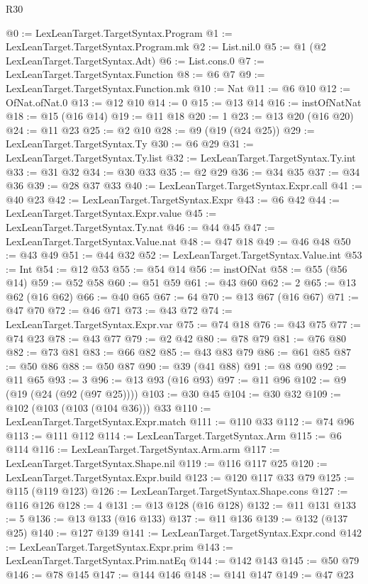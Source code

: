 \begin{lexlean}{R30}
\begin{coremodule}
@0 := LexLeanTarget.TargetSyntax.Program
@1 := LexLeanTarget.TargetSyntax.Program.mk
@2 := List.nil.{0}
@5 := @1 (@2 LexLeanTarget.TargetSyntax.Adt)
@6 := List.cons.{0}
@7 := LexLeanTarget.TargetSyntax.Function
@8 := @6 @7
@9 := LexLeanTarget.TargetSyntax.Function.mk
@10 := Nat
@11 := @6 @10
@12 := OfNat.ofNat.{0}
@13 := @12 @10
@14 := 0
@15 := @13 @14
@16 := instOfNatNat
@18 := @15 (@16 @14)
@19 := @11 @18
@20 := 1
@23 := @13 @20 (@16 @20)
@24 := @11 @23
@25 := @2 @10
@28 := @9 (@19 (@24 @25))
@29 := LexLeanTarget.TargetSyntax.Ty
@30 := @6 @29
@31 := LexLeanTarget.TargetSyntax.Ty.list
@32 := LexLeanTarget.TargetSyntax.Ty.int
@33 := @31 @32
@34 := @30 @33
@35 := @2 @29
@36 := @34 @35
@37 := @34 @36
@39 := @28 @37 @33
@40 := LexLeanTarget.TargetSyntax.Expr.call
@41 := @40 @23
@42 := LexLeanTarget.TargetSyntax.Expr
@43 := @6 @42
@44 := LexLeanTarget.TargetSyntax.Expr.value
@45 := LexLeanTarget.TargetSyntax.Ty.nat
@46 := @44 @45
@47 := LexLeanTarget.TargetSyntax.Value.nat
@48 := @47 @18
@49 := @46 @48
@50 := @43 @49
@51 := @44 @32
@52 := LexLeanTarget.TargetSyntax.Value.int
@53 := Int
@54 := @12 @53
@55 := @54 @14
@56 := instOfNat
@58 := @55 (@56 @14)
@59 := @52 @58
@60 := @51 @59
@61 := @43 @60
@62 := 2
@65 := @13 @62 (@16 @62)
@66 := @40 @65
@67 := 64
@70 := @13 @67 (@16 @67)
@71 := @47 @70
@72 := @46 @71
@73 := @43 @72
@74 := LexLeanTarget.TargetSyntax.Expr.var
@75 := @74 @18
@76 := @43 @75
@77 := @74 @23
@78 := @43 @77
@79 := @2 @42
@80 := @78 @79
@81 := @76 @80
@82 := @73 @81
@83 := @66 @82
@85 := @43 @83 @79
@86 := @61 @85
@87 := @50 @86
@88 := @50 @87
@90 := @39 (@41 @88)
@91 := @8 @90
@92 := @11 @65
@93 := 3
@96 := @13 @93 (@16 @93)
@97 := @11 @96
@102 := @9 (@19 (@24 (@92 (@97 @25))))
@103 := @30 @45
@104 := @30 @32
@109 := @102 (@103 (@103 (@104 @36))) @33
@110 := LexLeanTarget.TargetSyntax.Expr.match
@111 := @110 @33
@112 := @74 @96
@113 := @111 @112
@114 := LexLeanTarget.TargetSyntax.Arm
@115 := @6 @114
@116 := LexLeanTarget.TargetSyntax.Arm.arm
@117 := LexLeanTarget.TargetSyntax.Shape.nil
@119 := @116 @117 @25
@120 := LexLeanTarget.TargetSyntax.Expr.build
@123 := @120 @117 @33 @79
@125 := @115 (@119 @123)
@126 := LexLeanTarget.TargetSyntax.Shape.cons
@127 := @116 @126
@128 := 4
@131 := @13 @128 (@16 @128)
@132 := @11 @131
@133 := 5
@136 := @13 @133 (@16 @133)
@137 := @11 @136
@139 := @132 (@137 @25)
@140 := @127 @139
@141 := LexLeanTarget.TargetSyntax.Expr.cond
@142 := LexLeanTarget.TargetSyntax.Expr.prim
@143 := LexLeanTarget.TargetSyntax.Prim.natEq
@144 := @142 @143
@145 := @50 @79
@146 := @78 @145
@147 := @144 @146
@148 := @141 @147
@149 := @47 @23

\end{coremodule}
\end{lexlean}
